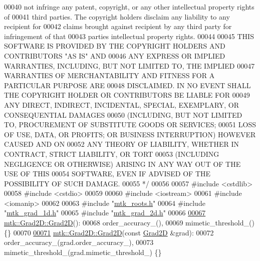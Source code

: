 \begin{DoxyCode}
00040 \textcolor{comment}{not infringe any patent, copyright, or any other intellectual property rights of}
00041 \textcolor{comment}{third parties. The copyright holders disclaim any liability to any recipient for}
00042 \textcolor{comment}{claims brought against recipient by any third party for infringement of that}
00043 \textcolor{comment}{parties intellectual property rights.}
00044 \textcolor{comment}{}
00045 \textcolor{comment}{THIS SOFTWARE IS PROVIDED BY THE COPYRIGHT HOLDERS AND CONTRIBUTORS "AS IS" AND}
00046 \textcolor{comment}{ANY EXPRESS OR IMPLIED WARRANTIES, INCLUDING, BUT NOT LIMITED TO, THE IMPLIED}
00047 \textcolor{comment}{WARRANTIES OF MERCHANTABILITY AND FITNESS FOR A PARTICULAR PURPOSE ARE}
00048 \textcolor{comment}{DISCLAIMED. IN NO EVENT SHALL THE COPYRIGHT HOLDER OR CONTRIBUTORS BE LIABLE FOR}
00049 \textcolor{comment}{ANY DIRECT, INDIRECT, INCIDENTAL, SPECIAL, EXEMPLARY, OR CONSEQUENTIAL DAMAGES}
00050 \textcolor{comment}{(INCLUDING, BUT NOT LIMITED TO, PROCUREMENT OF SUBSTITUTE GOODS OR SERVICES;}
00051 \textcolor{comment}{LOSS OF USE, DATA, OR PROFITS; OR BUSINESS INTERRUPTION) HOWEVER CAUSED AND ON}
00052 \textcolor{comment}{ANY THEORY OF LIABILITY, WHETHER IN CONTRACT, STRICT LIABILITY, OR TORT}
00053 \textcolor{comment}{(INCLUDING NEGLIGENCE OR OTHERWISE) ARISING IN ANY WAY OUT OF THE USE OF THIS}
00054 \textcolor{comment}{SOFTWARE, EVEN IF ADVISED OF THE POSSIBILITY OF SUCH DAMAGE.}
00055 \textcolor{comment}{*/}
00056 
00057 \textcolor{preprocessor}{#include <cstdlib>}
00058 \textcolor{preprocessor}{#include <cstdio>}
00059 
00060 \textcolor{preprocessor}{#include <iostream>}
00061 \textcolor{preprocessor}{#include <iomanip>}
00062 
00063 \textcolor{preprocessor}{#include "\hyperlink{mtk__roots_8h}{mtk\_roots.h}"}
00064 \textcolor{preprocessor}{#include "\hyperlink{mtk__grad__1d_8h}{mtk\_grad\_1d.h}"}
00065 \textcolor{preprocessor}{#include "\hyperlink{mtk__grad__2d_8h}{mtk\_grad\_2d.h}"}
00066 
\hypertarget{mtk__grad__2d_8cc_source_l00067}{}\hyperlink{classmtk_1_1Grad2D_a15bdca254b7bf662913b34c7afb8d4c9}{00067} \hyperlink{classmtk_1_1Grad2D_a15bdca254b7bf662913b34c7afb8d4c9}{mtk::Grad2D::Grad2D}():
00068   order\_accuracy\_(),
00069   mimetic\_threshold\_() \{\}
00070 
\hypertarget{mtk__grad__2d_8cc_source_l00071}{}\hyperlink{classmtk_1_1Grad2D_a31ccf118edb128c85f28b579bd9394a8}{00071} \hyperlink{classmtk_1_1Grad2D_a15bdca254b7bf662913b34c7afb8d4c9}{mtk::Grad2D::Grad2D}(\textcolor{keyword}{const} \hyperlink{classmtk_1_1Grad2D}{Grad2D} &grad):
00072   order\_accuracy\_(grad.order\_accuracy\_),
00073   mimetic\_threshold\_(grad.mimetic\_threshold\_) \{\}

\end{DoxyCode}
